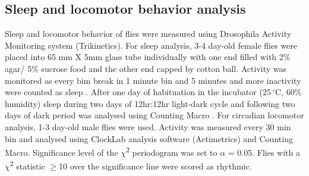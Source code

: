 \subsection*{Sleep and locomotor behavior analysis}

Sleep and locomotor behavior of flies were measured using Drosophila Activity Monitoring system (Trikinetics).
For sleep analysis, 3-4 day-old female flies were placed into 65 mm X 5mm glass tube individually with one end filled with 2\% agar/ 5\% sucrose food and the other end capped by cotton ball.
Activity was monitored as every bim break in 1 minute bin and 5 minutes and more inactivity were counted as sleep \cite{10710313}.
After one day of habituation in the incubator ($25\,^{\circ}\mathrm{C}$, 60\% humidity) sleep during two days of 12hr:12hr light-dark cycle and following two days of dark period was analysed using Counting Macro \cite{21041393}.
For circadian locomotor analysis, 1-3 day-old male flies were used. Activity was measured every 30 min bin and analysed using ClockLab analysis software (Actimetrics) and Counting Macro\cite{21041392}. Significance level of the $\chi$\textsuperscript{2} periodogram was set to $\alpha$ = 0.05.
Flies with a $\chi$\textsuperscript{2} statistic $\geq$10 over the significance line were scored as rhythmic.
  
  
  
  
  
  
  